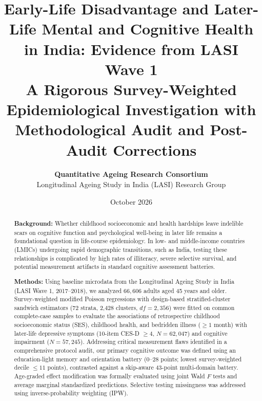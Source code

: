 \documentclass[11pt,a4paper]{article}
\title{\textbf{\LARGE Early-Life Disadvantage and Later-Life Mental and Cognitive Health in India: Evidence from LASI Wave 1}\\[0.4cm]
\large A Rigorous Survey-Weighted Epidemiological Investigation with Methodological Audit and Post-Audit Corrections}
\author{\textbf{Quantitative Ageing Research Consortium}\\[0.15cm]
\small Longitudinal Ageing Study in India (LASI) Research Group}
\date{October 2026}
\begin{document}
\maketitle

\begin{abstract}
\noindent\textbf{Background:} Whether childhood socioeconomic and health hardships leave indelible scars on cognitive function and psychological well-being in later life remains a foundational question in life-course epidemiology. In low- and middle-income countries (LMICs) undergoing rapid demographic transitions, such as India, testing these relationships is complicated by high rates of illiteracy, severe selective survival, and potential measurement artifacts in standard cognitive assessment batteries.

\vspace{0.2cm}
\noindent\textbf{Methods:} Using baseline microdata from the Longitudinal Ageing Study in India (LASI Wave 1, 2017--2018), we analyzed $66,606$ adults aged 45 years and older. Survey-weighted modified Poisson regressions with design-based stratified-cluster sandwich estimators (72 strata, 2,428 clusters, $df=2,356$) were fitted on common complete-case samples to evaluate the associations of retrospective childhood socioeconomic status (SES), childhood health, and bedridden illness ($\ge 1$ month) with later-life depressive symptoms (10-item CES-D $\ge 4$, $N=62,047$) and cognitive impairment ($N=57,245$). Addressing critical measurement flaws identified in a comprehensive protocol audit, our primary cognitive outcome was defined using an education-light memory and orientation battery (0--28 points; lowest survey-weighted decile $\le 11$ points), contrasted against a skip-aware 43-point multi-domain battery. Age-graded effect modification was formally evaluated using joint Wald $F$ tests and average marginal standardized predictions. Selective testing missingness was addressed using inverse-probability weighting (IPW).


\end{abstract}
\end{document}

